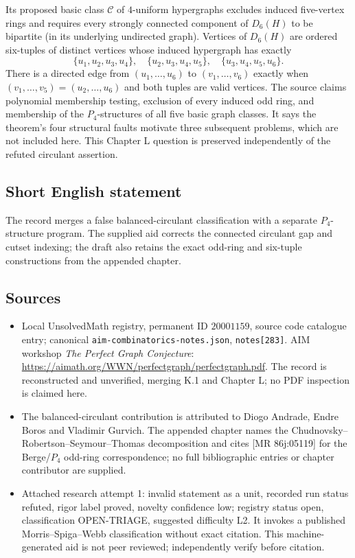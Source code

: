 \documentclass[11pt]{article}
\begin{document}
Its proposed basic class $\mathcal C$ of $4$-uniform hypergraphs excludes induced five-vertex rings and requires every strongly connected component of $D_6(H)$ to be bipartite (in its underlying undirected graph). Vertices of $D_6(H)$ are ordered six-tuples of distinct vertices whose induced hypergraph has exactly
\[
\{u_1,u_2,u_3,u_4\},\quad\{u_2,u_3,u_4,u_5\},\quad\{u_3,u_4,u_5,u_6\}.
\]
There is a directed edge from $(u_1,\ldots,u_6)$ to $(v_1,\ldots,v_6)$ exactly when $(v_1,\ldots,v_5)=(u_2,\ldots,u_6)$ and both tuples are valid vertices. The source claims polynomial membership testing, exclusion of every induced odd ring, and membership of the $P_4$-structures of all five basic graph classes. It says the theorem's four structural faults motivate three subsequent problems, which are not included here. This Chapter L question is preserved independently of the refuted circulant assertion.
\subsection{Short English statement}
The record merges a false balanced-circulant classification with a separate $P_4$-structure program. The supplied aid corrects the connected circulant gap and cutset indexing; the draft also retains the exact odd-ring and six-tuple constructions from the appended chapter.
\subsection{Sources}
\begin{itemize}
\item Local UnsolvedMath registry, permanent ID $20001159$, source code catalogue entry; canonical \texttt{aim-combinatorics-notes.json}, \texttt{notes[283]}. AIM workshop \emph{The Perfect Graph Conjecture}: \url{https://aimath.org/WWN/perfectgraph/perfectgraph.pdf}. The record is reconstructed and unverified, merging K.1 and Chapter L; no PDF inspection is claimed here.
\item The balanced-circulant contribution is attributed to Diogo Andrade, Endre Boros and Vladimir Gurvich. The appended chapter names the Chudnovsky--Robertson--Seymour--Thomas decomposition and cites [MR 86j:05119] for the Berge/$P_4$ odd-ring correspondence; no full bibliographic entries or chapter contributor are supplied.
\item Attached research attempt 1: invalid statement as a unit, recorded run status refuted, rigor label proved, novelty confidence low; registry status open, classification OPEN-TRIAGE, suggested difficulty L2. It invokes a published Morris--Spiga--Webb classification without exact citation. This machine-generated aid is not peer reviewed; independently verify before citation.
\end{itemize}
\end{document}

